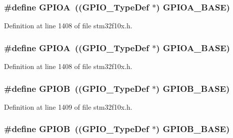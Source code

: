 \subsubsection[{\texorpdfstring{G\+P\+I\+OA}{GPIOA}}]{\setlength{\rightskip}{0pt plus 5cm}\#define G\+P\+I\+OA~(({\bf G\+P\+I\+O\+\_\+\+Type\+Def} $\ast$) {\bf G\+P\+I\+O\+A\+\_\+\+B\+A\+SE})}\hypertarget{group___peripheral__declaration_gac485358099728ddae050db37924dd6b7}{}\label{group___peripheral__declaration_gac485358099728ddae050db37924dd6b7}


Definition at line 1408 of file stm32f10x.\+h.

\subsubsection[{\texorpdfstring{G\+P\+I\+OA}{GPIOA}}]{\setlength{\rightskip}{0pt plus 5cm}\#define G\+P\+I\+OA~(({\bf G\+P\+I\+O\+\_\+\+Type\+Def} $\ast$) {\bf G\+P\+I\+O\+A\+\_\+\+B\+A\+SE})}\hypertarget{group___peripheral__declaration_gac485358099728ddae050db37924dd6b7}{}\label{group___peripheral__declaration_gac485358099728ddae050db37924dd6b7}


Definition at line 1408 of file stm32f10x.\+h.

\subsubsection[{\texorpdfstring{G\+P\+I\+OB}{GPIOB}}]{\setlength{\rightskip}{0pt plus 5cm}\#define G\+P\+I\+OB~(({\bf G\+P\+I\+O\+\_\+\+Type\+Def} $\ast$) {\bf G\+P\+I\+O\+B\+\_\+\+B\+A\+SE})}\hypertarget{group___peripheral__declaration_ga68b66ac73be4c836db878a42e1fea3cd}{}\label{group___peripheral__declaration_ga68b66ac73be4c836db878a42e1fea3cd}


Definition at line 1409 of file stm32f10x.\+h.

\subsubsection[{\texorpdfstring{G\+P\+I\+OB}{GPIOB}}]{\setlength{\rightskip}{0pt plus 5cm}\#define G\+P\+I\+OB~(({\bf G\+P\+I\+O\+\_\+\+Type\+Def} $\ast$) {\bf G\+P\+I\+O\+B\+\_\+\+B\+A\+SE})}\hypertarget{group___peripheral__declaration_ga68b66ac73be4c836db878a42e1fea3cd}{}\label{group___peripheral__declaration_ga68b66ac73be4c836db878a42e1fea3cd}


